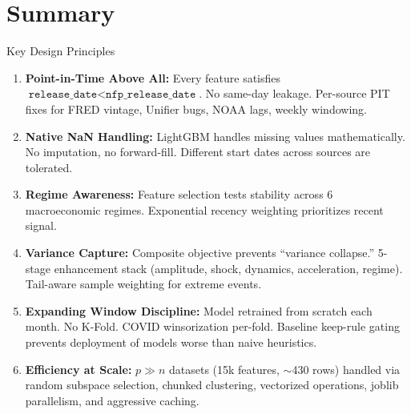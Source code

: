 \documentclass[aspectratio=169,10pt]{beamer}
\begin{document}
\section{Summary}

\begin{frame}{Key Design Principles}
\begin{enumerate}
  \item \textbf{Point-in-Time Above All:} Every feature satisfies $\texttt{release\_date} < \texttt{nfp\_release\_date}$. No same-day leakage. Per-source PIT fixes for FRED vintage, Unifier bugs, NOAA lags, weekly windowing.

  \item \textbf{Native NaN Handling:} LightGBM handles missing values mathematically. No imputation, no forward-fill. Different start dates across sources are tolerated.

  \item \textbf{Regime Awareness:} Feature selection tests stability across 6 macroeconomic regimes. Exponential recency weighting prioritizes recent signal.

  \item \textbf{Variance Capture:} Composite objective prevents ``variance collapse.'' 5-stage enhancement stack (amplitude, shock, dynamics, acceleration, regime). Tail-aware sample weighting for extreme events.

  \item \textbf{Expanding Window Discipline:} Model retrained from scratch each month. No K-Fold. COVID winsorization per-fold. Baseline keep-rule gating prevents deployment of models worse than naive heuristics.

  \item \textbf{Efficiency at Scale:} $p \gg n$ datasets (15k features, $\sim$430 rows) handled via random subspace selection, chunked clustering, vectorized operations, joblib parallelism, and aggressive caching.
\end{enumerate}
\end{frame}
\end{document}

